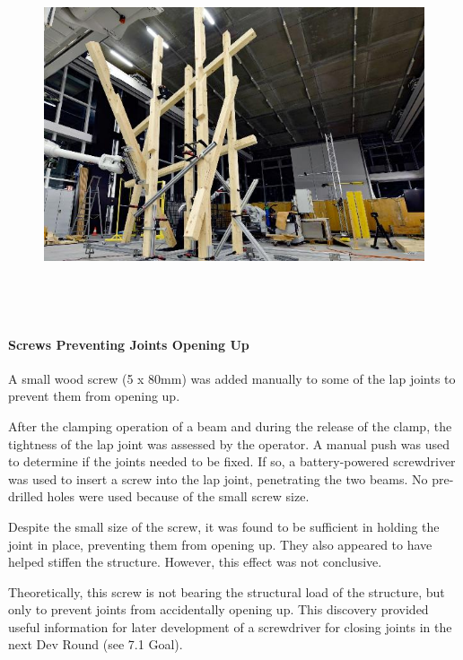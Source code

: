 \documentclass[11pt]{book}
\begin{document}
\begin{figure}[H]
\includegraphics[width=15.92cm,height=10.62cm]{./images/image72.jpeg}
\end{figure}


\paragraph{Screws Preventing Joints Opening Up}

A small wood screw (5 x 80mm) was added manually to some of the lap joints to prevent them from opening up. 

After the clamping operation of a beam and during the release of the clamp, the tightness of the lap joint was assessed by the operator. A manual push was used to determine if the joints needed to be fixed. If so, a battery-powered screwdriver was used to insert a screw into the lap joint, penetrating the two beams. No pre-drilled holes were used because of the small screw size. 

Despite the small size of the screw, it was found to be sufficient in holding the joint in place, preventing them from opening up. They also appeared to have helped stiffen the structure. However, this effect was not conclusive.

Theoretically, this screw is not bearing the structural load of the structure, but only to prevent joints from accidentally opening up. This discovery provided useful information for later development of a screwdriver for closing joints in the next Dev Round (see 7.1 Goal). 
\end{document}
